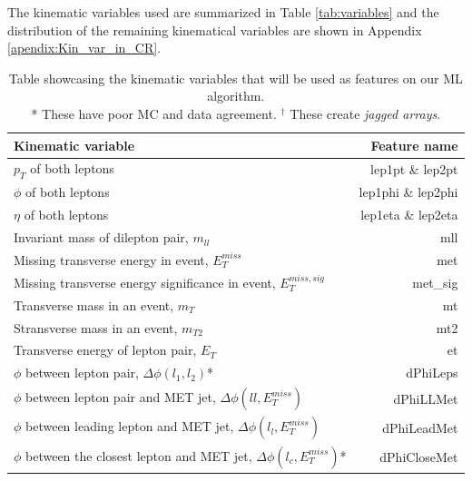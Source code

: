 \documentclass[12pt, a4paper]{book}
\begin{document}
\clearpage\noindent The kinematic variables used are summarized in Table \ref{tab:variables} and the distribution of the remaining kinematical variables are shown in Appendix \ref{apendix:Kin_var_in_CR}.
\begin{table}[!h]
    \centering
    \caption[Kinematic variables used as features]{Table showcasing the kinematic variables that will be used as features on our ML algorithm.\\ * These have poor MC and data agreement. $^\dagger$ These create \textit{jagged arrays}.}
    \begin{tabular}{l|r}\midrule\midrule
        Kinematic variable                                                              & Feature name          \\\midrule
        $p_T$ of both leptons                                                           & lep1pt \& lep2pt      \\
        $\phi$ of both leptons                                                          & lep1phi \& lep2phi    \\
        $\eta$ of both leptons                                                          & lep1eta \& lep2eta    \\
        Invariant mass of dilepton pair, $m_{ll}$                                       & mll \\
        Missing transverse energy in event, $E_T^{miss}$                                & met \\
        Missing transverse energy significance in event, $E_T^{miss,sig}$               & met\_sig \\
        Transverse mass in an event, $m_T$                                              & mt \\
        Stransverse mass in an event, $m_{T2}$                                          & mt2\\
        Transverse energy of lepton pair, $E_T$                                         & et \\
        $\phi$ between lepton pair, $\Delta\phi(l_1,l_2)$*                              & dPhiLeps \\
        $\phi$ between lepton pair and MET jet, $\Delta\phi(ll,E_T^{miss})$             & dPhiLLMet \\
        $\phi$ between leading lepton and MET jet, $\Delta\phi(l_l,E_T^{miss})$         & dPhiLeadMet \\
        $\phi$ between the closest lepton and MET jet, $\Delta\phi(l_c,E_T^{miss})$*    & dPhiCloseMet \\

\end{tabular}
\end{table}
\end{document}
